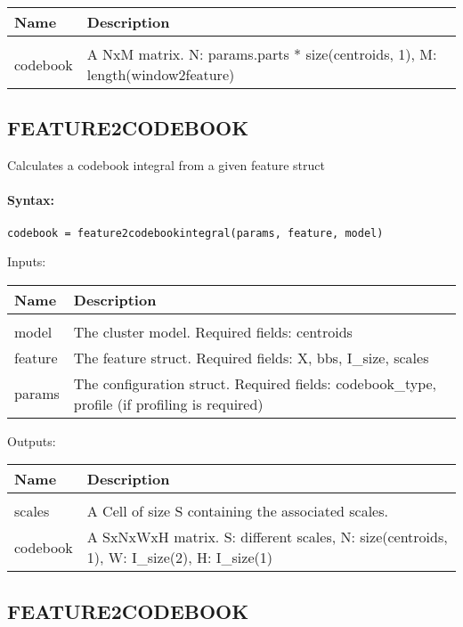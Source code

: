 \begin{tabular}{|l|p{5cm}|}
\hline
\textbf{Name} & \textbf{Description} \\
\hline \hline \\
codebook & A NxM matrix. N: params.parts * size(centroids, 1), M: length(window2feature)  \\ \hline
\end{tabular}

\subsection{FEATURE2CODEBOOK}

Calculates a codebook integral from a given feature struct

\paragraph{Syntax:} \verb|codebook = feature2codebookintegral(params, feature, model)|

Inputs:

\begin{tabular}{|l|p{5cm}|}
\hline
\textbf{Name} & \textbf{Description} \\
\hline \hline \\
model & The cluster model. Required fields: centroids  \\ \hline
feature & The feature struct. Required fields: X, bbs, I\_size, scales  \\ \hline
params & The configuration struct. Required fields: codebook\_type, profile (if profiling is required)  \\ \hline
\end{tabular}
Outputs:

\begin{tabular}{|l|p{5cm}|}
\hline
\textbf{Name} & \textbf{Description} \\
\hline \hline \\
scales & A Cell of size S containing the associated scales.  \\ \hline
codebook & A SxNxWxH matrix. S: different scales, N: size(centroids, 1), W: I\_size(2), H: I\_size(1)  \\ \hline
\end{tabular}

\subsection{FEATURE2CODEBOOK}

